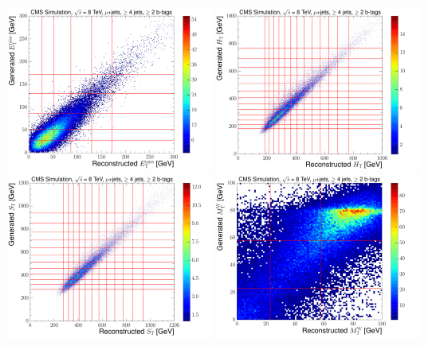  \begin{figure}[H]
    \centering
     \includegraphics[width=0.48\textwidth]{Chapters/04_Analysis/04b_XSections/images/binning/muon_MET_8TeV.pdf}\hfill
     \includegraphics[width=0.48\textwidth]{Chapters/04_Analysis/04b_XSections/images/binning/muon_HT_8TeV.pdf}\\
     \includegraphics[width=0.48\textwidth]{Chapters/04_Analysis/04b_XSections/images/binning/muon_ST_8TeV.pdf}\hfill
     \includegraphics[width=0.48\textwidth]{Chapters/04_Analysis/04b_XSections/images/binning/muon_MT_8TeV.pdf}\\

\end{figure}
